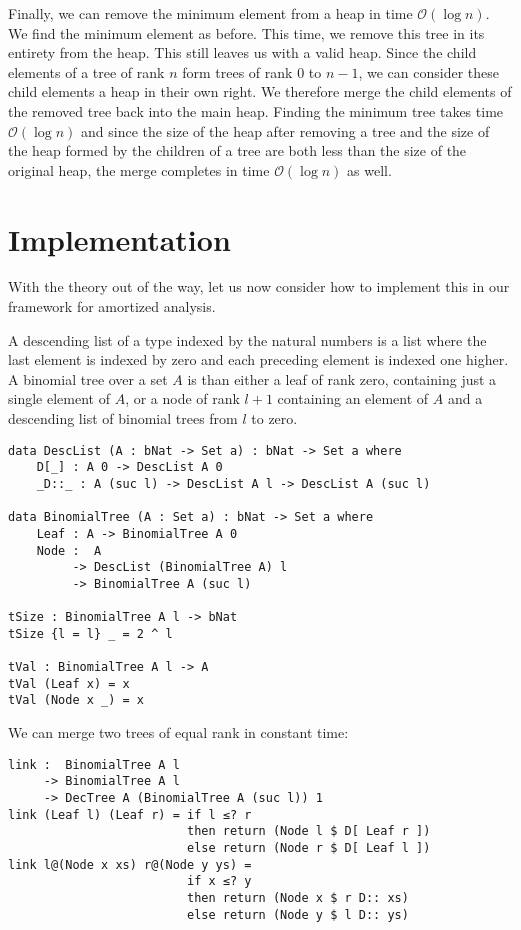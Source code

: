 Finally, we can remove the minimum element from a heap in time $\mathcal O(\log n)$. We find the minimum element as before. This time, we remove this tree in its entirety from the heap. This still leaves us with a valid heap. Since the child elements of a tree of rank $n$ form trees of rank $0$ to $n-1$, we can consider these child elements a heap in their own right. We therefore merge the child elements of the removed tree back into the main heap. Finding the minimum tree takes time $\mathcal O(\log n)$ and since the size of the heap after removing a tree and the size of the heap formed by the children of a tree are both less than the size of the original heap, the merge completes in time $\mathcal O(\log n)$ as well.

\section{Implementation}
With the theory out of the way, let us now consider how to implement this in our framework for amortized analysis.

A descending list of a type indexed by the natural numbers is a list where the last element is indexed by zero and each preceding element is indexed one higher. A binomial tree over a set $A$ is than either a leaf of rank zero, containing just a single element of $A$, or a node of rank $l+1$ containing an element of $A$ and a descending list of binomial trees from $l$ to zero.

\begin{lstlisting}[caption={Definition of a binomial tree},label={lst:binomial:tree},emph={DescList,BinomialTree,Leaf,Node}]
data DescList (A : bNat -> Set a) : bNat -> Set a where
    D[_] : A 0 -> DescList A 0
    _D::_ : A (suc l) -> DescList A l -> DescList A (suc l)

data BinomialTree (A : Set a) : bNat -> Set a where
    Leaf : A -> BinomialTree A 0
    Node :  A
         -> DescList (BinomialTree A) l
         -> BinomialTree A (suc l)

tSize : BinomialTree A l -> bNat
tSize {l = l} _ = 2 ^ l

tVal : BinomialTree A l -> A
tVal (Leaf x) = x
tVal (Node x _) = x
\end{lstlisting}

We can merge two trees of equal rank in constant time:

\begin{lstlisting}[caption={Merging two trees},label={lst:binomial:link},emph={link,Leaf,Node,if,then,else}]
link :  BinomialTree A l
     -> BinomialTree A l
     -> DecTree A (BinomialTree A (suc l)) 1
link (Leaf l) (Leaf r) = if l ≤? r
                         then return (Node l $ D[ Leaf r ])
                         else return (Node r $ D[ Leaf l ])
link l@(Node x xs) r@(Node y ys) =
                         if x ≤? y
                         then return (Node x $ r D:: xs)
                         else return (Node y $ l D:: ys)
\end{lstlisting}

